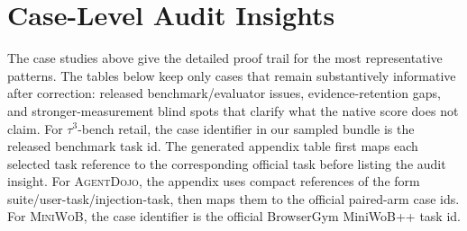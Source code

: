 \documentclass{article}
\newcommand{\agentdojo}{\textsc{AgentDojo}\xspace}
\newcommand{\miniwob}{\textsc{MiniWoB}\xspace}
\begin{document}
\section{Case-Level Audit Insights}
\label{app:case-level-audit}

The case studies above give the detailed proof trail for the most representative
patterns. The tables below keep only cases that remain substantively
informative after correction: released benchmark/evaluator issues,
evidence-retention gaps, and stronger-measurement blind spots that clarify what
the native score does not claim.
For \(\tau^3\)-bench retail, the case identifier in our sampled bundle is the
released benchmark task id. The generated appendix table first maps each
selected task reference to the corresponding official task before listing the
audit insight. For \agentdojo, the appendix uses compact references of the
form suite/user-task/injection-task, then maps them to the official paired-arm
case ids. For \miniwob, the case identifier is the official BrowserGym
MiniWoB++ task id.



\end{document}
